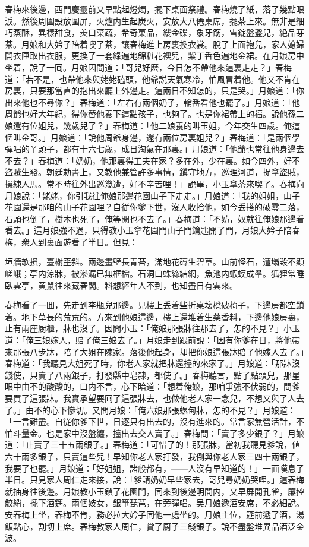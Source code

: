 春梅來後邊，西門慶靈前又早點起燈燭，擺下桌面祭禮。春梅燒了紙，落了幾點眼淚。然後周圍設放圍屏，火爐内生起炭火，安放大八僊桌席，擺茶上來。無非是細巧蒸酥，異樣甜食，羙口菜蔬，希奇菓品，縷金碟，象牙筯，雪錠盤盞兒，絶品芽茶。月娘和大妗子陪着喫了茶，讓春梅進上房裏換衣裳。脫了上面袍兒，家人媳婦開衣匣取出衣服，更換了一套綠遍地錦粧花襖兒，紫丁香色遍地金裙。在月娘房中坐着，說了一囘。月娘因問道：「哥兒好麽，今日怎不帶他來這裏走走？」春梅道：「若不是，也帶他來與姥姥磕頭，他爺説天氣寒冷，怕風冒着他。他又不肯在房裏，只要那當直的抱出來廳上外邊走。這兩日不知怎的，只是哭。」月娘道：「你出來他也不尋你？」春梅道：「左右有兩個奶子，輪番看他也罷了。」月娘道：「他周爺也好大年紀，得你替他養下這點孩子，也夠了。也是你裙帶上的福。說他孫二娘還有位姐兒，幾歲兒了？」春梅道：「他二娘養的叫玉姐，今年交生四歲。俺這個叫金哥。」月娘道：「說他周爺身邊，還有兩位房裏姐兒？」春梅道：「是兩個學彈唱的丫頭子，都有十六七歲，成日淘氣在那裏。」月娘道：「他爺也常往他身邊去不去？」春梅道：「奶奶，他那裏得工夫在家？多在外，少在裏。如今四外，好不盜賊生發。朝廷勅書上，又教他兼管許多事情，鎭守地方，巡理河道，捉拿盜賊，操練人馬。常不時往外出巡幾遭，好不辛苦哩！」說畢，小玉拿茶來喫了。春梅向月娘說：「姥姥，你引我往俺娘那邊花園山子下走走。」月娘道：「我的姐姐，山子花園還是那咱的山子花園哩？自従你爹下世，沒人收拾他，如今丢搭的破零二落，石頭也倒了，樹木也死了，俺等閑也不去了。」春梅道：「不妨，奴就往俺娘那邊看看去。」這月娘強不過，只得教小玉拿花園門山子門鑰匙開了門，月娘大妗子陪春梅，衆人到裏面遊看了半日。但見：

\begin{myquote}
垣牆欹損，臺榭歪斜。兩邊畫壁長青苔，滿地花磚生碧草。山前怪石，遭塌毀不顯嵯峨；亭内涼牀，被滲漏已無框檔。石洞口蛛絲結網，魚池内蝦蟆成羣。狐狸常睡臥雲亭，黄鼠往來藏春閣。料想經年人不到，也知盡日有雲來。
\end{myquote}

春梅看了一囬，先走到李瓶兒那邊。見樓上丢着些折桌壞櫈破椅子，下邊房都空鎖着。地下草長的荒荒的。方來到他娘這邊，樓上還堆着生薬香料，下邊他娘房裏，止有兩座厨櫃，牀也沒了。因問小玉：「俺娘那張牀往那去了，怎的不見？」小玉道：「俺三娘嫁人，賠了俺三娘去了。」月娘走到跟前說：「因有你爹在日，將他帶來那張八步牀，陪了大姐在陳家。落後他起身，却把你娘這張牀賠了他嫁人去了。」春梅道：「我聽見大姐死了時，你老人家就把牀還擡的來家了。」月娘道：「那牀沒錢使，只賣了八兩銀子，打發縣中皂隸，都使了。」春梅聽言，點了點頭兒，那星眼中由不的酸酸的，口内不言，心下暗道：「想着俺娘，那咱爭強不伏弱的，問爹要買了這張牀。我實承望要囘了這張牀去，也做他老人家一念兒，不想又與了人去了。」由不的心下慘切。又問月娘：「俺六娘那張螺甸牀，怎的不見？」月娘道：「一言難盡。自従你爹下世，日逐只有出去的，沒有進來的。常言家無營活計，不怕斗量金。也是家中沒盤纏，擡出去交人賣了。」春梅問：「賣了多少銀子？」月娘道：「止賣了三十五兩銀子。」春梅道：「可惜了的！那張牀，當初我聽見爹說，値六十兩多銀子，只賣這些兒！早知你老人家打發，我倒與你老人家三四十兩銀子，我要了也罷。」月娘道：「好姐姐，諸般都有，——人沒有早知道的！」一面嘆息了半日。只見家人周仁走來接，說：「爹請奶奶早些家去，哥兒尋奶奶哭哩。」這春梅就抽身往後邊。月娘教小玉鎖了花園門，同來到後邊明間内，又早屏開孔雀，簾控鮫綃，擺下酒筳。兩個妓女，銀箏琵琶，在旁彈唱。吴月娘遞酒安席，不必細說。安春梅上坐，春梅不肯，務必拉大妗子同他一處坐的。月娘主位，筵前遞了酒，湯飯點心，割切上席。春梅教家人周仁，賞了厨子三錢銀子。說不盡盤堆異品酒泛金波。

